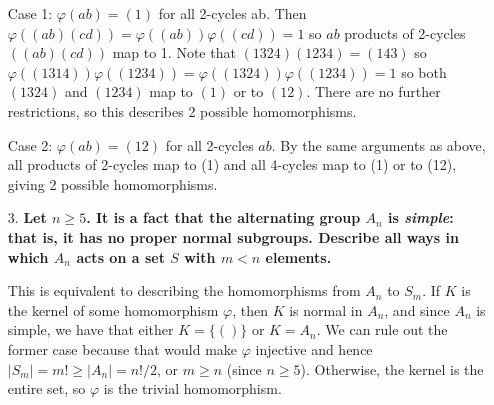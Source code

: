 \documentclass[a4paper,12pt]{article}
\begin{document}
\begin{enumerate}
            Case 1: $\varphi(ab) = (1)$ for all 2-cycles ab. Then $\varphi((ab)(cd)) = \varphi((ab))\varphi((cd)) = 1$ so $ab$ products of 2-cycles $((ab)(cd))$ map to 1. Note that $(1324)(1234) = (143)$ so $\varphi((1314))\varphi((1234)) = \varphi((1324))\varphi((1234)) = 1$ so both $(1324)$ and $(1234)$ map to $(1)$ or to $(12)$. There are no further restrictions, so this describes 2 possible homomorphisms. \par
            Case 2: $\varphi(ab) = (12)$ for all 2-cycles $ab$. By the same arguments as above, all products of 2-cycles map to (1) and all 4-cycles map to (1) or to (12), giving 2 possible homomorphisms.
        \fi

    \item[3.]
        \boldmath
        \textbf{Let $n \geq 5$. It is a fact that the alternating group $A_n$ is \textit{simple}: that is, it has no proper normal subgroups. Describe all ways in which $A_n$ acts on a set $S$ with $m < n$ elements.} \par
        \unboldmath
        This is equivalent to describing the homomorphisms from $A_n$ to $S_m$. If $K$ is the kernel of some homomorphism $\varphi$, then $K$ is normal in $A_n$, and since $A_n$ is simple, we have that either $K = \{ () \}$ or $K = A_n$. We can rule out the former case because that would make $\varphi$ injective and hence $|S_m| = m! \geq |A_n| = n!/2$, or $m \geq n$ (since $n \geq 5$). Otherwise, the kernel is the entire set, so $\varphi$ is the trivial homomorphism.
\end{enumerate}
\end{document}
